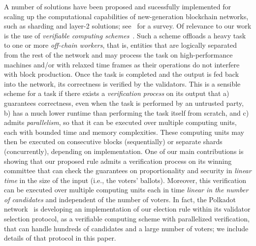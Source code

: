 A number of solutions have been proposed and sucessfully implemented for scaling up the computational capabilities of new-generation blockchain networks, such as sharding and layer-2 solutions; see~\cite{zhou2020solutions} for a survey. 
Of relevance to our work is the use of \emph{verifiable computing schemes}~\cite{gennaro2010non}. Such a scheme offloads a heavy task to one or more \emph{off-chain workers}, that is, entities that are logically separated from the rest of the network and may process the task on high-performance machines and/or with relaxed time frames as their operations do not interfere with block production. Once the task is completed and the output is fed back into the network, its correctness is verified by the validators. 
This is a sensible scheme for a task if there exists a \emph{verification process} on its output that a) guarantees correctness, even when the task is performed by an untrusted party, b) has a much lower runtime than performing the task itself from scratch, and c) admits \emph{parallelism}, so that it can be executed over multiple computing units, each with bounded time and memory complexities. 
These computing units may then be executed on consecutive blocks (sequentially) or separate shards (concurrently), depending on implementation.
One of our main contributions is showing that our proposed rule admits a verification process on its winning committee that can check the guarantees on proportionality and security in \emph{linear time} in the size of the input (i.e., the voters' ballots). Moreover, this verification can be executed over multiple computing units each in time \emph{linear in the number of candidates} and independent of the number of voters. 
In fact, the Polkadot network~\cite{burdges2020overview} is developing an implementation of our election rule within its validator selection protocol, as a verifiable computing scheme with parallelized verification, that can handle hundreds of candidates and a large number of voters; we include details of that protocol in this paper. 

